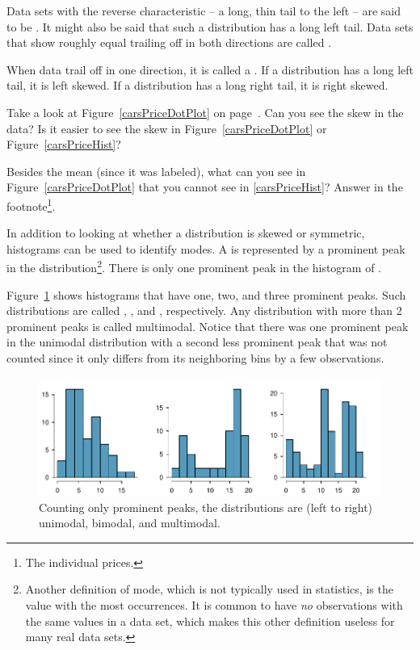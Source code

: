 Data sets with the reverse characteristic -- a long, thin tail to the left -- are said to be . It might also be said that such a distribution has a long left tail. Data sets that show roughly equal trailing off in both directions are called .

\begin{termBox}{
When data trail off in one direction, it is called a . If a distribution has a long left tail, it is left skewed. If a distribution has a long right tail, it is right skewed.}
\end{termBox}

\begin{exercise}
Take a look at Figure~\ref{carsPriceDotPlot} on page~\pageref{carsPriceDotPlot}. Can you see the skew in the data? Is it easier to see the skew in Figure~\ref{carsPriceDotPlot} or Figure~\ref{carsPriceHist}?
\end{exercise}

\begin{exercise}
Besides the mean (since it was labeled), what can you see in Figure~\ref{carsPriceDotPlot} that you cannot see in \ref{carsPriceHist}? Answer in the footnote\footnote{The individual prices.}.
\end{exercise}

In addition to looking at whether a distribution is skewed or symmetric, histograms can be used to identify modes. A  is represented by a prominent peak in the distribution\footnote{Another definition of mode, which is not typically used in statistics, is the value with the most occurrences. It is common to have \emph{no} observations with the same values in a data set, which makes this other definition useless for many real data sets.}. There is only one prominent peak in the histogram of .

Figure~\ref{singleBiMultiModalPlots} shows histograms that have one, two, and three prominent peaks. Such distributions are called , , and , respectively. Any distribution with more than 2 prominent peaks is called multimodal. Notice that there was one prominent peak in the unimodal distribution with a second less prominent peak that was not counted since it only differs from its neighboring bins by a few observations.
\begin{figure}[h]
   \centering
   \includegraphics[width=\textwidth]{01/figures/singleBiMultiModalPlots/singleBiMultiModalPlots}
   \caption{Counting only prominent peaks, the distributions are (left to right) unimodal, bimodal, and multimodal.}
   \label{singleBiMultiModalPlots}
\end{figure}

